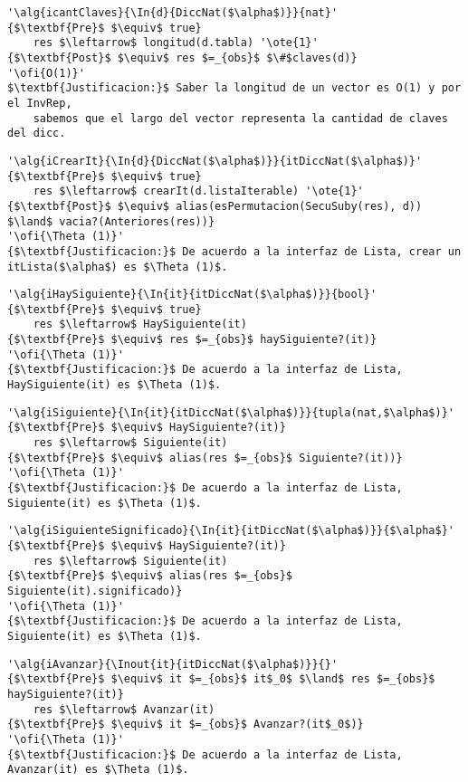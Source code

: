 \begin{lstlisting}[mathescape]
'\alg{icantClaves}{\In{d}{DiccNat($\alpha$)}}{nat}'
{$\textbf{Pre}$ $\equiv$ true}
	res $\leftarrow$ longitud(d.tabla) '\ote{1}'
{$\textbf{Post}$ $\equiv$ res $=_{obs}$ $\#$claves(d)}
'\ofi{O(1)}'
$\textbf{Justificacion:}$ Saber la longitud de un vector es O(1) y por el InvRep,
	sabemos que el largo del vector representa la cantidad de claves del dicc.
\end{lstlisting}

%
%

\begin{lstlisting}[mathescape]
'\alg{iCrearIt}{\In{d}{DiccNat($\alpha$)}}{itDiccNat($\alpha$)}'
{$\textbf{Pre}$ $\equiv$ true}
	res $\leftarrow$ crearIt(d.listaIterable) '\ote{1}'
{$\textbf{Post}$ $\equiv$ alias(esPermutacion(SecuSuby(res), d)) $\land$ vacia?(Anteriores(res))}
'\ofi{\Theta (1)}'
{$\textbf{Justificacion:}$ De acuerdo a la interfaz de Lista, crear un itLista($\alpha$) es $\Theta (1)$.
\end{lstlisting}

\begin{lstlisting}[mathescape]
'\alg{iHaySiguiente}{\In{it}{itDiccNat($\alpha$)}}{bool}'
{$\textbf{Pre}$ $\equiv$ true}
	res $\leftarrow$ HaySiguiente(it)
{$\textbf{Pre}$ $\equiv$ res $=_{obs}$ haySiguiente?(it)}
'\ofi{\Theta (1)}'
{$\textbf{Justificacion:}$ De acuerdo a la interfaz de Lista, HaySiguiente(it) es $\Theta (1)$.
\end{lstlisting}

\begin{lstlisting}[mathescape]
'\alg{iSiguiente}{\In{it}{itDiccNat($\alpha$)}}{tupla(nat,$\alpha$)}'
{$\textbf{Pre}$ $\equiv$ HaySiguiente?(it)}
	res $\leftarrow$ Siguiente(it)
{$\textbf{Pre}$ $\equiv$ alias(res $=_{obs}$ Siguiente?(it))}
'\ofi{\Theta (1)}'
{$\textbf{Justificacion:}$ De acuerdo a la interfaz de Lista, Siguiente(it) es $\Theta (1)$.
\end{lstlisting}

\begin{lstlisting}[mathescape]
'\alg{iSiguienteSignificado}{\In{it}{itDiccNat($\alpha$)}}{$\alpha$}'
{$\textbf{Pre}$ $\equiv$ HaySiguiente?(it)}
	res $\leftarrow$ Siguiente(it)
{$\textbf{Pre}$ $\equiv$ alias(res $=_{obs}$ Siguiente(it).significado)}
'\ofi{\Theta (1)}'
{$\textbf{Justificacion:}$ De acuerdo a la interfaz de Lista, Siguiente(it) es $\Theta (1)$.
\end{lstlisting}

\begin{lstlisting}[mathescape]
'\alg{iAvanzar}{\Inout{it}{itDiccNat($\alpha$)}}{}'
{$\textbf{Pre}$ $\equiv$ it $=_{obs}$ it$_0$ $\land$ res $=_{obs}$ haySiguiente?(it)}
	res $\leftarrow$ Avanzar(it)
{$\textbf{Pre}$ $\equiv$ it $=_{obs}$ Avanzar?(it$_0$)}
'\ofi{\Theta (1)}'
{$\textbf{Justificacion:}$ De acuerdo a la interfaz de Lista, Avanzar(it) es $\Theta (1)$.
\end{lstlisting}
